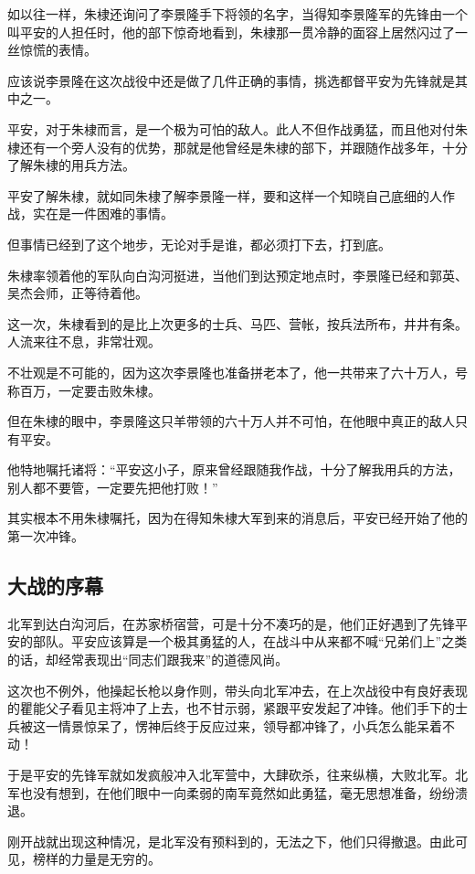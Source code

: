 \begin{multicols}{\theparacolNo}
		如以往一样，朱棣还询问了李景隆手下将领的名字，当得知李景隆军的先锋由一个叫平安的人担任时，他的部下惊奇地看到，朱棣那一贯冷静的面容上居然闪过了一丝惊慌的表情。

		应该说李景隆在这次战役中还是做了几件正确的事情，挑选都督平安为先锋就是其中之一。

		平安，对于朱棣而言，是一个极为可怕的敌人。此人不但作战勇猛，而且他对付朱棣还有一个旁人没有的优势，那就是他曾经是朱棣的部下，并跟随作战多年，十分了解朱棣的用兵方法。

		平安了解朱棣，就如同朱棣了解李景隆一样，要和这样一个知晓自己底细的人作战，实在是一件困难的事情。

		但事情已经到了这个地步，无论对手是谁，都必须打下去，打到底。

		朱棣率领着他的军队向白沟河挺进，当他们到达预定地点时，李景隆已经和郭英、吴杰会师，正等待着他。

		这一次，朱棣看到的是比上次更多的士兵、马匹、营帐，按兵法所布，井井有条。人流来往不息，非常壮观。

		不壮观是不可能的，因为这次李景隆也准备拼老本了，他一共带来了六十万人，号称百万，一定要击败朱棣。

		但在朱棣的眼中，李景隆这只羊带领的六十万人并不可怕，在他眼中真正的敌人只有平安。

		他特地嘱托诸将：“平安这小子，原来曾经跟随我作战，十分了解我用兵的方法，别人都不要管，一定要先把他打败！”

		其实根本不用朱棣嘱托，因为在得知朱棣大军到来的消息后，平安已经开始了他的第一次冲锋。

		\subsection{大战的序幕}
		北军到达白沟河后，在苏家桥宿营，可是十分不凑巧的是，他们正好遇到了先锋平安的部队。平安应该算是一个极其勇猛的人，在战斗中从来都不喊“兄弟们上”之类的话，却经常表现出“同志们跟我来”的道德风尚。

		这次也不例外，他操起长枪以身作则，带头向北军冲去，在上次战役中有良好表现的瞿能父子看见主将冲了上去，也不甘示弱，紧跟平安发起了冲锋。他们手下的士兵被这一情景惊呆了，愣神后终于反应过来，领导都冲锋了，小兵怎么能呆着不动！

		于是平安的先锋军就如发疯般冲入北军营中，大肆砍杀，往来纵横，大败北军。北军也没有想到，在他们眼中一向柔弱的南军竟然如此勇猛，毫无思想准备，纷纷溃退。

		刚开战就出现这种情况，是北军没有预料到的，无法之下，他们只得撤退。由此可见，榜样的力量是无穷的。


\end{multicols}
